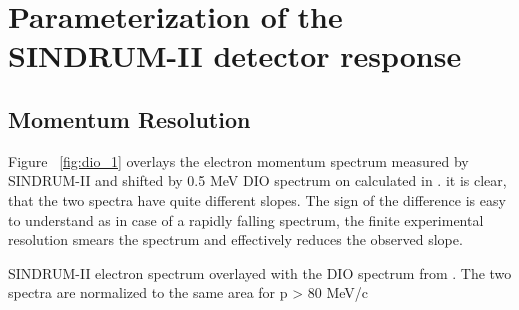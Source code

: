 \newpage
\section {Parameterization of the SINDRUM-II detector response}

\subsection{Momentum Resolution}

Figure ~\ref{fig:dio_1} overlays the electron momentum spectrum measured by SINDRUM-II
and shifted by 0.5 MeV DIO spectrum on  calculated in \cite{Watanabe_1993}.
it is clear, that the two spectra have quite different slopes.
The sign of the difference is easy to understand as in case of a rapidly falling
spectrum, the finite experimental resolution smears the spectrum and effectively
reduces the observed slope. 

\vspace{0.2in}
 {
  \label{fig:dio_1}
  SINDRUM-II electron spectrum overlayed with the DIO spectrum from \cite{Watanabe_1993}.
  The two spectra are normalized to the same area for p > 80 MeV/c
}

